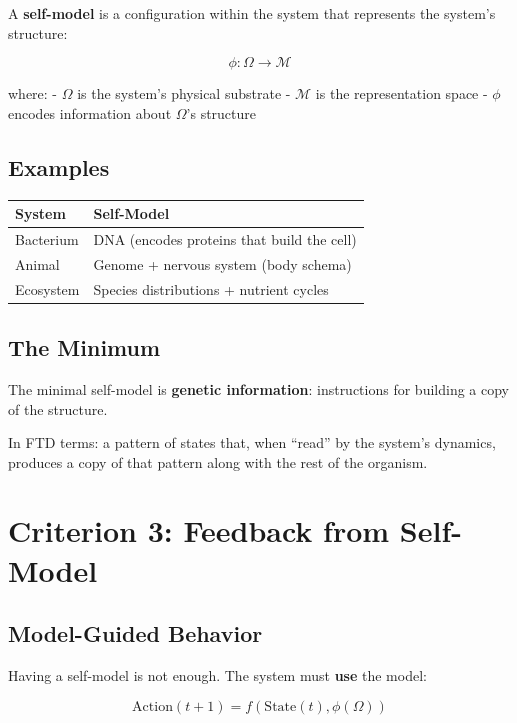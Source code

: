 \documentclass[
  11pt,
  letterpaper,
  twoside,
  openright]{book}
\begin{document}
A \textbf{self-model} is a configuration within the system that
represents the system's structure:

\[\phi: \Omega \to \mathcal{M}\]

where: - \(\Omega\) is the system's physical substrate - \(\mathcal{M}\)
is the representation space - \(\phi\) encodes information about
\(\Omega\)'s structure

\subsection{Examples}\label{examples-3}

\begin{longtable}[]{@{}ll@{}}
\toprule\noalign{}
System & Self-Model \\
\midrule\noalign{}
\endhead
\bottomrule\noalign{}
\endlastfoot
Bacterium & DNA (encodes proteins that build the cell) \\
Animal & Genome + nervous system (body schema) \\
Ecosystem & Species distributions + nutrient cycles \\
\end{longtable}

\subsection{The Minimum}\label{the-minimum}

The minimal self-model is \textbf{genetic information}: instructions for
building a copy of the structure.

In FTD terms: a pattern of states that, when ``read'' by the system's
dynamics, produces a copy of that pattern along with the rest of the
organism.

\section{Criterion 3: Feedback from
Self-Model}\label{criterion-3-feedback-from-self-model}

\subsection{Model-Guided Behavior}\label{model-guided-behavior}

Having a self-model is not enough. The system must \textbf{use} the
model:

\[\text{Action}(t+1) = f(\text{State}(t), \phi(\Omega))\]
\end{document}
